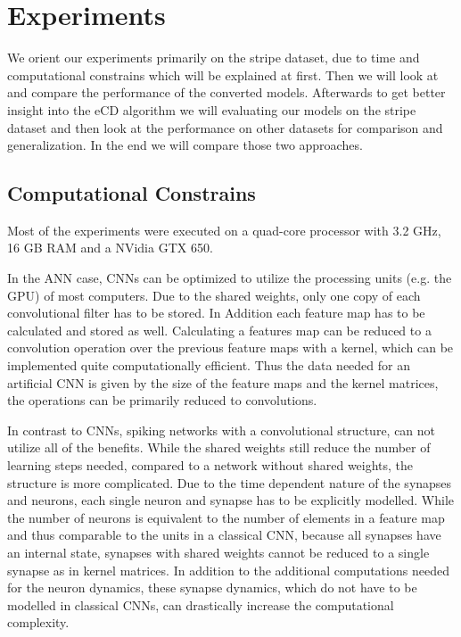 \section{Experiments} \label{c:exps}

We orient our experiments primarily on the stripe dataset, due to time and computational constrains which will be explained at first.
Then we will look at and compare the performance of the converted models.
Afterwards to get better insight into the eCD algorithm we will evaluating our models on the stripe dataset and then look at the performance on other datasets for comparison and generalization.
In the end we will compare those two approaches.

\subsection{Computational Constrains} \label{c:compconstr}

Most of the experiments were executed on a quad-core processor with 3.2 GHz, 16 GB RAM and a NVidia GTX 650.

In the ANN case, CNNs can be optimized to utilize the processing units (e.g. the GPU) of most computers. 
Due to the shared weights, only one copy of each convolutional filter has to be stored. 
In Addition each feature map has to be calculated and stored as well.
Calculating a features map can be reduced to a convolution operation over the previous feature maps with a kernel, which can be implemented quite computationally efficient.
Thus the data needed for an artificial CNN is given by the size of the feature maps and the kernel matrices, the operations can be primarily reduced to convolutions.  

In contrast to CNNs, spiking networks with a convolutional structure, can not utilize all of the benefits.
While the shared weights still reduce the number of learning steps needed, compared to a network without shared weights, the structure is more complicated.
Due to the time dependent nature of the synapses and neurons, each single neuron and synapse has to be explicitly modelled.
While the number of neurons is equivalent to the number of elements in a feature map and thus comparable to the units in a classical CNN, because all synapses have an internal state, synapses with shared weights cannot be reduced to a single synapse as in kernel matrices.
In addition to the additional computations needed for the neuron dynamics, these synapse dynamics, which do not have to be modelled in classical CNNs, can drastically increase the computational complexity.   

